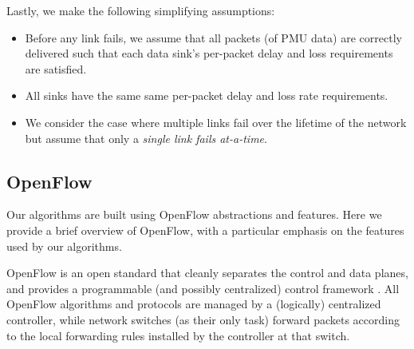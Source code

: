 
Lastly, we make the following simplifying assumptions:
\begin{itemize}

	\item Before any link fails, we assume that all packets (of PMU data) are correctly delivered such that each data sink's per-packet delay and loss requirements are satisfied.

	\item All sinks have the same same per-packet delay and loss rate requirements.  

	\item We consider the case where multiple links fail over the lifetime of the network but assume that only a \emph{single link fails at-a-time}.


\end{itemize}


\subsection{OpenFlow}
\label{subsec:openflow}

Our algorithms are built using OpenFlow abstractions and features. Here we provide a brief overview of OpenFlow, with a particular emphasis on the features used by our algorithms.

OpenFlow is an open standard that cleanly separates the control and data planes, and provides a programmable (and possibly centralized) control framework \cite{OpenFlow08}.
All OpenFlow algorithms and protocols are managed by a (logically) centralized controller, while network switches (as their only task) forward packets according to the local
forwarding rules installed by the controller at that switch.


